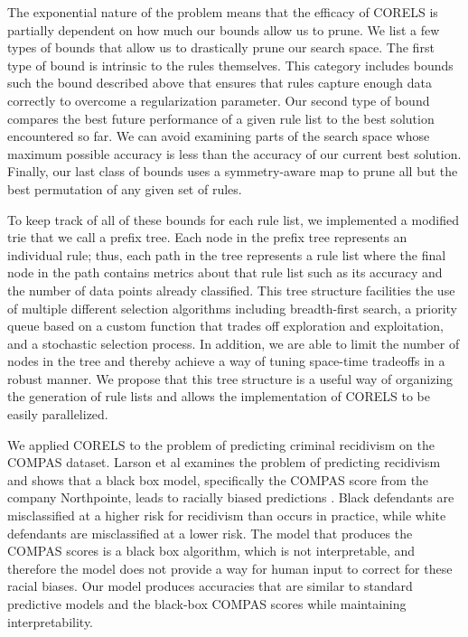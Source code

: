 \documentclass[]{report}
\theoremstyle{definition}
\begin{document}
The exponential nature of the problem means that the efficacy of CORELS is partially dependent on how much our bounds allow us to prune. 
We list a few types of bounds that allow us to drastically prune our search space. 
The first type of bound is intrinsic to the rules themselves.
This category includes bounds such the bound described above that ensures that rules capture enough data correctly to overcome a regularization parameter. 
Our second type of bound compares the best future performance of a given rule list to the best solution encountered so far. 
We can avoid examining parts of the search space whose maximum possible accuracy is less than the accuracy of our current best solution. 
Finally, our last class of bounds uses a symmetry-aware map to prune all but the best permutation of any given set of rules.

To keep track of all of these bounds for each rule list, we implemented a modified trie that we call a prefix tree. 
Each node in the prefix tree represents an individual rule; thus, each path in the tree represents a rule list where the final node in the path contains metrics about that rule list such as its accuracy and the number of data points already classified.
This tree structure facilities the use of multiple different selection algorithms including breadth-first search, a priority queue based on a custom function that trades off exploration and exploitation, and a stochastic selection process. 
In addition, we are able to limit the number of nodes in the tree and thereby achieve a way of tuning space-time tradeoffs in a robust manner. 
We propose that this tree structure is a useful way of organizing the generation of rule lists and allows the implementation of CORELS to be easily parallelized.

We applied CORELS to the problem of predicting criminal recidivism on the COMPAS dataset.
Larson et al examines the problem of predicting recidivism and shows that a black box model, specifically the COMPAS score from the company Northpointe, leads to racially biased predictions \cite{LarsonMaKiAn16}.
Black defendants are misclassified at a higher risk for recidivism than occurs in practice, while white defendants are misclassified at a lower risk. 
The model that produces the COMPAS scores is a black box algorithm, which is not interpretable, and therefore the model does not provide a way for human input to correct for these racial biases. 
Our model produces accuracies that are similar to standard predictive models and the black-box COMPAS scores while maintaining interpretability.
\end{document}
